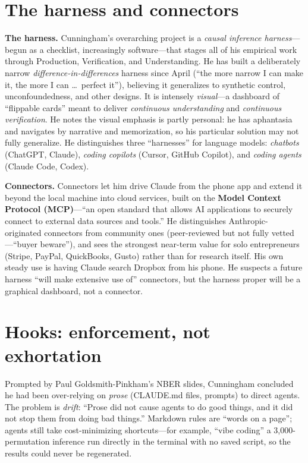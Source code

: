 \documentclass[11pt]{article}
\begin{document}
\section{The harness and connectors}
\textbf{The harness.} Cunningham's overarching project is a \emph{causal
inference harness}---begun as a checklist, increasingly software---that stages
all of his empirical work through Production, Verification, and Understanding.
He has built a deliberately narrow \emph{difference-in-differences} harness since
April (``the more narrow I can make it, the more I can \ldots\ perfect it''),
believing it generalizes to synthetic control, unconfoundedness, and other
designs. It is intensely \emph{visual}---a dashboard of ``flippable cards'' meant
to deliver \emph{continuous understanding} and \emph{continuous verification}. He
notes the visual emphasis is partly personal: he has aphantasia and navigates by
narrative and memorization, so his particular solution may not fully generalize.
He distinguishes three ``harnesses'' for language models: \emph{chatbots}
(ChatGPT, Claude), \emph{coding copilots} (Cursor, GitHub Copilot), and
\emph{coding agents} (Claude Code, Codex).

\textbf{Connectors.} Connectors let him drive Claude from the phone app and
extend it beyond the local machine into cloud services, built on the
\textbf{Model Context Protocol (MCP)}---``an open standard that allows AI
applications to securely connect to external data sources and tools.'' He
distinguishes Anthropic-originated connectors from community ones (peer-reviewed
but not fully vetted---``buyer beware''), and sees the strongest near-term value
for solo entrepreneurs (Stripe, PayPal, QuickBooks, Gusto) rather than for
research itself. His own steady use is having Claude search Dropbox from his
phone. He suspects a future harness ``will make extensive use of'' connectors,
but the harness proper will be a graphical dashboard, not a connector.

\section{Hooks: enforcement, not exhortation}
Prompted by Paul Goldsmith-Pinkham's NBER slides, Cunningham concluded he had
been over-relying on \emph{prose} (CLAUDE.md files, prompts) to direct agents.
The problem is \emph{drift}: ``Prose did not cause agents to do good things, and
it did not stop them from doing bad things.'' Markdown rules are ``words on a
page''; agents still take cost-minimizing shortcuts---for example, ``vibe
coding'' a 3,000-permutation inference run directly in the terminal with no saved
script, so the results could never be regenerated.
\end{document}
